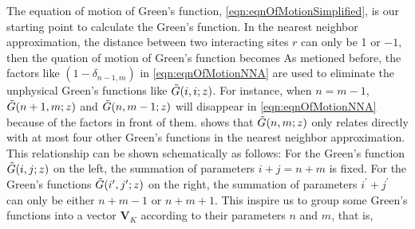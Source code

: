 The equation of motion of Green's function, \autoref{eqn:eqnOfMotionSimplified}, is our starting point to calculate
the Green's function. In the nearest neighbor approximation, the distance between two interacting sites $r$ can only 
be 1 or $-1$, then the quation of motion of Green's function becomes
As metioned before, the factors like $(1- \delta_{n-1, m})$ in \autoref{eqn:eqnOfMotionNNA} are used to eliminate 
the unphysical Green's functions like $\Tilde{G}(i, i; z)$. For instance, when $n = m - 1$, $\Tilde{G}(n+1, m; z)$ and 
$\Tilde{G}(n, m-1; z)$ will disappear in \autoref{eqn:eqnOfMotionNNA} because of the factors in front of them. 
 shows that $\Tilde{G}(n, m; z)$ only relates directly with at most four other Green's
functions in the nearest neighbor approximation. This relationship can be shown schematically as follows:
For the Green's function $\Tilde{G}(i, j; z)$ on the left, the summation of parameters $i + j = n + m$ is fixed. For the 
Green's functions $\Tilde{G}(i^{\prime}, j^{\prime}; z)$ on the right, the summation of parameters
 $i^{\prime} + j^{\prime}$ can only be either $n+m-1$ or $n+m+1$. 
This inspire us to group some Green's functions into a vector $\mathbf{V}_{K}$ according to their parameters $n$ and $m$, that is,
